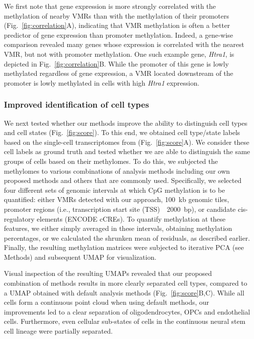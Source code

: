 \documentclass[10pt]{article}
\begin{document}
We first note that gene expression is more strongly correlated with the methylation of nearby VMRs than with the methylation of their promoters (Fig.~\ref{fig:correlation}A), indicating that VMR methylation is often a better predictor of gene expression than promoter methylation.
Indeed, a gene-wise comparison revealed many genes whose expression is correlated with the nearest VMR, but not with promoter methylation.
One such example gene, \textit{Htra1}, is depicted in Fig.~\ref{fig:correlation}B.
While the promoter of this gene is lowly methylated regardless of gene expression, a VMR located downstream of the promoter is lowly methylated in cells with high \textit{Htra1} expression.

\subsubsection*{Improved identification of cell types}

We next tested whether our methods improve the ability to distinguish cell types and cell states (Fig.~\ref{fig:score}).
To this end, we obtained cell type/state labels based on the single-cell transcriptomes from \citet{kremer_scnmt} (Fig.~\ref{fig:score}A).
We consider these cell labels as ground truth and tested whether we are able to distinguish the same groups of cells based on their methylomes.
To do this, we subjected the methylomes to various combinations of analysis methods including our own proposed methods and others that are commonly used.
Specifically, we selected four different sets of genomic intervals at which CpG methylation is to be quantified:
either VMRs detected with our approach, 100~kb genomic tiles, promoter regions (i.e., transcription start site (TSS)~\textpm~2000~bp), or candidate cis-regulatory elements (ENCODE cCREs\citep{encode2020expanded}).
To quantify methylation at these features, we either simply averaged in these intervals, obtaining methylation percentages, or we calculated the shrunken mean of residuals, as described earlier.
Finally, the resulting methylation matrices were subjected to iterative PCA (see Methods) and subsequent UMAP for visualization.


Visual inspection of the resulting UMAPs revealed that our proposed combination of methods results in more clearly separated cell types, compared to a UMAP obtained with default analysis methods (Fig.~\ref{fig:score}B,C).
While all cells form a continuous point cloud when using default methods, our improvements led to a clear separation of oligodendrocytes, OPCs and endothelial cells.
Furthermore, even cellular sub-states of cells in the continuous neural stem cell lineage were partially separated.
\end{document}
